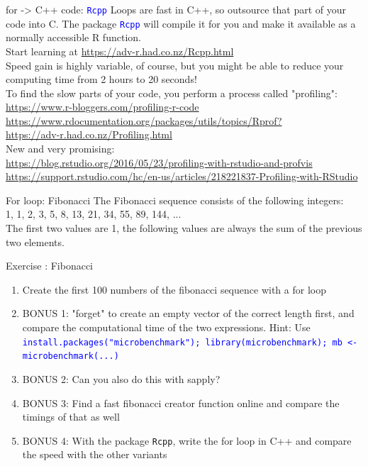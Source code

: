 \documentclass[xcolor=table,           xcolor=dvipsnames]{beamer}\usepackage[]{graphicx}\usepackage[]{color}
\newcounter{exercisecount}
\newenvironment{exercise}[1]
{%
\stepcounter{exercisecount}
\begin{block}{Exercise \arabic{exercisecount}: #1}
}
{%
\end{block} }
\newcommand{\rcode}[1]{\texttt{\textcolor{Blue}{#1}}} %
\begin{document}

\begin{frame}[fragile]{for -> C++ code: \rcode{Rcpp}}
\small
Loops are fast in C++, so outsource that part of your code into C.
The package \rcode{Rcpp} will compile it for you and make it available as a normally accessible R function.\\
\pause
Start learning at 
\url{https://adv-r.had.co.nz/Rcpp.html}\\
\pause
Speed gain is highly variable, of course, but you might be able to reduce your computing time from 2 hours to 20 seconds!\\[1em]
\pause
To find the slow parts of your code, you perform a process called "profiling":\\
\url{https://www.r-bloggers.com/profiling-r-code}\\
\url{https://www.rdocumentation.org/packages/utils/topics/Rprof?}\\
\url{https://adv-r.had.co.nz/Profiling.html}\\
\pause
New and very promising:\\
\scriptsize
\url{https://blog.rstudio.org/2016/05/23/profiling-with-rstudio-and-profvis}\\
\url{https://support.rstudio.com/hc/en-us/articles/218221837-Profiling-with-RStudio}
\end{frame}


\begin{frame}[fragile]{For loop: Fibonacci}
The Fibonacci sequence consists of the following integers:\\
1, 1, 2, 3, 5, 8, 13, 21, 34, 55, 89, 144, ...\\
The first two values are 1, the following values are always the sum of the previous two elements.
\begin{exercise}{Fibonacci}
\begin{enumerate}
\item Create the first 100 numbers of the fibonacci sequence with a for loop
\item BONUS 1: "forget" to create an empty vector of the correct length first, and compare the computational time of the two expressions. Hint: Use \rcode{install.packages("microbenchmark"); library(microbenchmark); mb <- microbenchmark(...)}
\item BONUS 2: Can you also do this with sapply?
\item BONUS 3: Find a fast fibonacci creator function online and compare the timings of that as well
\item BONUS 4: With the package \texttt{Rcpp}, write the for loop in C++ and compare the speed with the other variants
\end{enumerate}
\end{exercise}
\end{frame}
\end{document}
